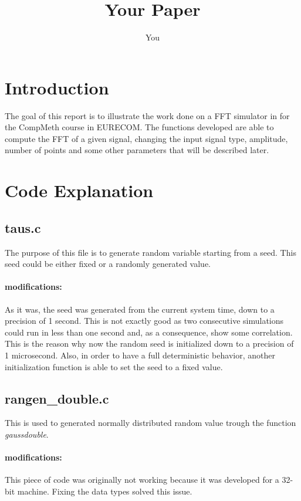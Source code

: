 \documentclass[a4paper]{article}
\title{Your Paper}
\author{You}
\begin{document}
\maketitle

\section{Introduction}

The goal of this report is to illustrate the work done on a FFT simulator in for the CompMeth course in EURECOM.
The functions developed are able to compute the FFT of a given signal, changing the input signal type, amplitude, number of points and some other parameters that will be described later.

\section{Code Explanation}
\subsection{taus.c}
The purpose of this file is to generate random variable starting from a seed. This seed could be either fixed or a randomly generated value.
\paragraph{modifications:}
As it was, the seed was generated from the current system time, down to a precision of 1 second. This is not exactly good as two consecutive simulations could run in less than one second and, as a consequence, show some correlation. This is the reason why now the random seed is initialized down to a precision of 1 microsecond.
Also, in order to have a full deterministic behavior, another initialization function is able to set the seed to a fixed value.

\subsection{rangen\_double.c}
This is used to generated normally distributed random value trough the function \textit{gaussdouble}.
\paragraph{modifications:}
This piece of code was originally not working because it was developed for a 32-bit machine. Fixing the data types solved this issue.
\end{document}
